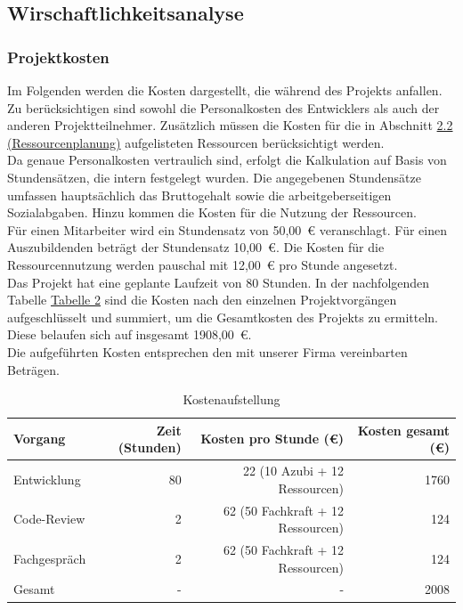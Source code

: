 \documentclass[a4paper,12pt]{article}
\begin{document}
\subsection{Wirschaftlichkeitsanalyse}
\subsubsection{Projektkosten}
Im Folgenden werden die Kosten dargestellt, die während des Projekts anfallen. Zu berücksichtigen sind sowohl die Personalkosten des Entwicklers als auch der anderen Projektteilnehmer. Zusätzlich müssen die Kosten für die in Abschnitt \hyperref[sec:ressourcenplanung]{2.2 (Ressourcenplanung)} aufgelisteten Ressourcen berücksichtigt werden.\\
Da genaue Personalkosten vertraulich sind, erfolgt die Kalkulation auf Basis von Stundensätzen, die intern festgelegt wurden. Die angegebenen Stundensätze umfassen hauptsächlich das Bruttogehalt sowie die arbeitgeberseitigen Sozialabgaben. Hinzu kommen die Kosten für die Nutzung der Ressourcen.\\
Für einen Mitarbeiter wird ein Stundensatz von 50,00~€ veranschlagt. Für einen Auszubildenden beträgt der Stundensatz 10,00~€. Die Kosten für die Ressourcennutzung werden pauschal mit 12,00~€ pro Stunde angesetzt.\\
Das Projekt hat eine geplante Laufzeit von 80 Stunden. In der nachfolgenden Tabelle \hyperlink{Kostenaufstellung}{Tabelle 2} sind die Kosten nach den einzelnen Projektvorgängen aufgeschlüsselt und summiert, um die Gesamtkosten des Projekts zu ermitteln. Diese belaufen sich auf insgesamt 1908,00~€.\\
Die aufgeführten Kosten entsprechen den mit unserer Firma vereinbarten Beträgen.

\hypertarget{Kostenaufstellung}{}
\begin{table}[h]
\centering
\begin{tabular}{|l|r|r|r|}
\hline
\rowcolor{gray}
\textbf{Vorgang} & \textbf{Zeit (Stunden)} & \textbf{Kosten pro Stunde (€)} & \textbf{Kosten gesamt (€)} \\
\hline
Entwicklung & 80 & 22 (10 Azubi + 12 Ressourcen) & 1760 \\
\hline
Code-Review & 2 & 62 (50 Fachkraft + 12 Ressourcen) & 124 \\
\hline
Fachgespräch & 2 & 62 (50 Fachkraft + 12 Ressourcen) & 124 \\
\hline
\hline
Gesamt & - & - & 2008 \\
\hline
\end{tabular}
\caption{Kostenaufstellung}
\label{tab:Kostenaufstellung}
\end{table}
\end{document}
